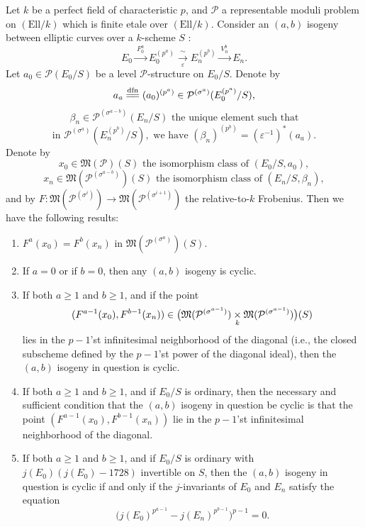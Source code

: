 \begin{kthm}\label{thm:13.3.5}
Let $k$ be a perfect field of characteristic $p$, and $\mathcal{P}$ a representable moduli problem on $(\mathrm{Ell}/k)$ which is finite etale over $(\mathrm{Ell}/k)$. Consider an $(a,b)$ isogeny between elliptic curves over a $k$-scheme $S$ :
\[
E_0 \xrightarrow{\ F_0^a\ } E_0^{(p^a)} \xrightarrow[\varepsilon]{\ \sim\ } E_n^{(p^b)} \xrightarrow{\ V_n^b\ } E_n .
\]
Let $a_0 \in \mathcal{P}(E_0/S)$ be a level $\mathcal{P}$-structure on $E_0/S$. Denote by
\[
a_a \xlongequal{\mathrm{dfn}} (a_0)^{(p^a)} \in \mathcal{P}^{(\sigma^a)}(E_0^{(p^a)}/S) ,
\]
\[
\beta_n \in \mathcal{P}^{(\sigma^{a-b})}(E_n/S) \text{ the unique element such that}
\]
\[
\text{in } \mathcal{P}^{(\sigma^a)}(E_n^{(p^b)}/S), \text{ we have } (\beta_n)^{(p^b)} = (\varepsilon^{-1})^*(a_a) .
\]
Denote by
\[
x_0 \in \mathfrak{M}(\mathcal{P})(S) \text{ the isomorphism class of } (E_0/S, a_0) ,
\]
\[
x_n \in \mathfrak{M}(\mathcal{P}^{(\sigma^{a-b})})(S) \text{ the isomorphism class of } (E_n/S, \beta_n) ,
\]
and by $F : \mathfrak{M}(\mathcal{P}^{(\sigma^i)}) \to \mathfrak{M}(\mathcal{P}^{(\sigma^{i+1})})$ the relative-to-$k$ Frobenius. Then we have the following results:
\begin{enumerate}[label=(\arabic*)]
\item $F^a(x_0) = F^b(x_n)$ in $\mathfrak{M}(\mathcal{P}^{(\sigma^a)})(S)$.
\item If $a = 0$ or if $b = 0$, then any $(a,b)$ isogeny is cyclic.
\item If both $a \ge 1$ and $b \ge 1$, and if the point
\[
(F^{a-1}(x_0), F^{b-1}(x_n)) \in \bigl( \mathfrak{M}(\mathcal{P}^{(\sigma^{a-1})}) \underset{k}{\times} \mathfrak{M}(\mathcal{P}^{(\sigma^{a-1})}) \bigr)(S)
\]
lies in the $p-1$'st infinitesimal neighborhood of the diagonal (i.e., the closed subscheme defined by the $p-1$'st power of the diagonal ideal), then the $(a,b)$ isogeny in question is cyclic.
\item If both $a \ge 1$ and $b \ge 1$, and if $E_0/S$ is ordinary, then the necessary and sufficient condition that the $(a,b)$ isogeny in question be cyclic is that the point $(F^{a-1}(x_0), F^{b-1}(x_n))$ lie in the $p-1$'st infinitesimal neighborhood of the diagonal.
\item If both $a \ge 1$ and $b \ge 1$, and if $E_0/S$ is ordinary with $j(E_0)(j(E_0)-1728)$ invertible on $S$, then the $(a,b)$ isogeny in question is cyclic if and only if the $j$-invariants of $E_0$ and $E_n$ satisfy the equation
\[
\bigl( j(E_0)^{p^{a-1}} - j(E_n)^{p^{b-1}} \bigr)^{p-1} = 0 .
\]
\end{enumerate}
\end{kthm}

